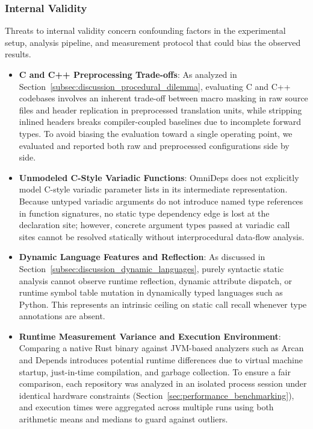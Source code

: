 \subsubsection{Internal Validity}
\label{subsec:internal_validity}

Threats to internal validity concern confounding factors in the experimental
setup, analysis pipeline, and measurement protocol that could bias the observed
results.

\begin{itemize}[leftmargin=2.5em]
  \item \textbf{C and C++ Preprocessing Trade-offs}:
    As analyzed in Section~\ref{subsec:discussion_procedural_dilemma},
    evaluating C and C++ codebases involves an inherent trade-off between macro
    masking in raw source files and header replication in preprocessed
    translation units, while stripping inlined headers breaks compiler-coupled
    baselines due to incomplete forward types. To avoid biasing the evaluation
    toward a single operating point, we evaluated and reported both raw and
    preprocessed configurations side by side.

  \item \textbf{Unmodeled C-Style Variadic Functions}:
    OmniDeps does not explicitly model C-style variadic parameter lists in its
    intermediate representation. Because untyped variadic arguments do not
    introduce named type references in function signatures, no static type
    dependency edge is lost at the declaration site; however, concrete argument
    types passed at variadic call sites cannot be resolved statically without
    interprocedural data-flow analysis.

  \item \textbf{Dynamic Language Features and Reflection}:
    As discussed in Section~\ref{subsec:discussion_dynamic_languages}, purely
    syntactic static analysis cannot observe runtime reflection, dynamic
    attribute dispatch, or runtime symbol table mutation in dynamically typed
    languages such as Python. This represents an intrinsic ceiling on static
    call recall whenever type annotations are absent.

  \item \textbf{Runtime Measurement Variance and Execution Environment}:
    Comparing a native Rust binary against JVM-based analyzers such as Arcan
    and Depends introduces potential runtime differences due to virtual machine
    startup, just-in-time compilation, and garbage collection. To ensure a fair
    comparison, each repository was analyzed in an isolated process session
    under identical hardware constraints
    (Section~\ref{sec:performance_benchmarking}),
    and execution times were aggregated across multiple runs using both
    arithmetic means and medians to guard against outliers.
\end{itemize}

